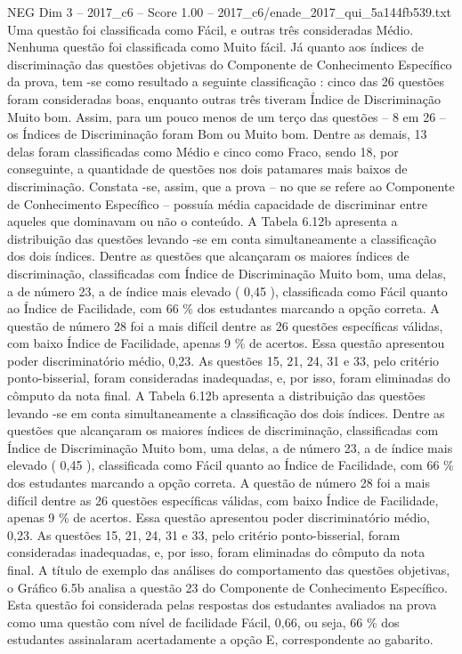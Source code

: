 \begin{textsample}{NEG Dim 3 – 2017\_c6 – Score 1.00 – 2017\_c6/enade\_2017\_qui\_5a144fb539.txt}
Uma questão foi classificada como Fácil, e outras três consideradas Médio.
Nenhuma questão foi classificada como Muito fácil.
Já quanto aos índices de discriminação das questões objetivas do Componente de Conhecimento Específico da prova, tem -se como resultado a seguinte classificação : cinco das 26 questões foram consideradas boas, enquanto outras três tiveram Índice de Discriminação Muito bom.
Assim, para um pouco menos de um terço das questões – 8 em 26 – os Índices de Discriminação foram Bom ou Muito bom.
Dentre as demais, 13 delas foram classificadas como Médio e cinco como Fraco, sendo 18, por conseguinte, a quantidade de questões nos dois patamares mais baixos de discriminação.
Constata -se, assim, que a prova – no que se refere ao Componente de Conhecimento Específico – possuía média capacidade de discriminar entre aqueles que dominavam ou não o conteúdo.
A Tabela 6.12b apresenta a distribuição das questões levando -se em conta simultaneamente a classificação dos dois índices.
Dentre as questões que alcançaram os maiores índices de discriminação, classificadas com Índice de Discriminação Muito bom, uma delas, a de número 23, a de índice mais elevado ( 0,45 ), classificada como Fácil quanto ao Índice de Facilidade, com 66 \% dos estudantes marcando a opção correta.
A questão de número 28 foi a mais difícil dentre as 26 questões específicas válidas, com baixo Índice de Facilidade, apenas 9 \% de acertos.
Essa questão apresentou poder discriminatório médio, 0,23.
As questões 15, 21, 24, 31 e 33, pelo critério ponto-bisserial, foram consideradas inadequadas, e, por isso, foram eliminadas do cômputo da nota final.
A Tabela 6.12b apresenta a distribuição das questões levando -se em conta simultaneamente a classificação dos dois índices.
Dentre as questões que alcançaram os maiores índices de discriminação, classificadas com Índice de Discriminação Muito bom, uma delas, a de número 23, a de índice mais elevado ( 0,45 ), classificada como Fácil quanto ao Índice de Facilidade, com 66 \% dos estudantes marcando a opção correta.
A questão de número 28 foi a mais difícil dentre as 26 questões específicas válidas, com baixo Índice de Facilidade, apenas 9 \% de acertos.
Essa questão apresentou poder discriminatório médio, 0,23.
As questões 15, 21, 24, 31 e 33, pelo critério ponto-bisserial, foram consideradas inadequadas, e, por isso, foram eliminadas do cômputo da nota final.
A título de exemplo das análises do comportamento das questões objetivas, o Gráfico 6.5b analisa a questão 23 do Componente de Conhecimento Específico.
Esta questão foi considerada pelas respostas dos estudantes avaliados na prova como uma questão com nível de facilidade Fácil, 0,66, ou seja, 66 \% dos estudantes assinalaram acertadamente a opção E, correspondente ao gabarito.

\end{textsample}
